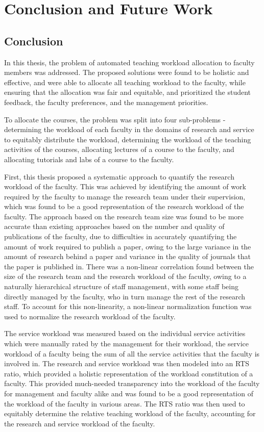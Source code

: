 \chapter{Conclusion and Future Work}

\section{Conclusion}

In this thesis, the problem of automated teaching workload allocation to faculty members was addressed. The proposed solutions were found to be holistic and effective, and were able to allocate all teaching workload to the faculty, while ensuring that the allocation was fair and equitable, and prioritized the student feedback, the faculty preferences, and the management priorities.

To allocate the courses, the problem was split into four sub-problems - determining the workload of each faculty in the domains of research and service to equitably distribute the workload, determining the workload of the teaching activities of the courses, allocating lectures of a course to the faculty, and allocating tutorials and labs of a course to the faculty.

First, this thesis proposed a systematic approach to quantify the research workload of the faculty. This was achieved by identifying the amount of work required by the faculty to manage the research team under their supervision, which was found to be a good representation of the research workload of the faculty. The approach based on the research team size was found to be more accurate than existing approaches based on the number and quality of publications of the faculty, due to difficulties in accurately quantifying the amount of work required to publish a paper, owing to the large variance in the amount of research behind a paper and variance in the quality of journals that the paper is published in. There was a non-linear correlation found between the size of the research team and the research workload of the faculty, owing to a naturally hierarchical structure of staff management, with some staff being directly managed by the faculty, who in turn manage the rest of the research staff. To account for this non-linearity, a non-linear normalization function was used to normalize the research workload of the faculty.

The service workload was measured based on the individual service activities which were manually rated by the management for their workload, the service workload of a faculty being the sum of all the service activities that the faculty is involved in. The research and service workload was then modeled into an RTS ratio, which provided a holistic representation of the workload constitution of a faculty. This provided much-needed transparency into the workload of the faculty for management and faculty alike and was found to be a good representation of the workload of the faculty in various areas. The RTS ratio was then used to equitably determine the relative teaching workload of the faculty, accounting for the research and service workload of the faculty.

